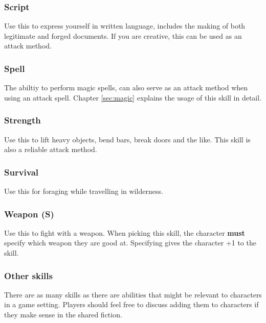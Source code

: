 \begin{multicols}{2}
\subsubsection*{Script}
Use this to express yourself in written language, includes the making of both legitimate and forged documents. If you are creative, this can be used as an attack method.
\subsubsection*{Spell}
The abiltiy to perform magic spells, can also serve as an attack method when using an attack spell. Chapter \ref{sec:magic} explains the usage of this skill in detail.
\subsubsection*{Strength}
Use this to lift heavy objects, bend bars, break doors and the like. This skill is also a reliable attack method.
\subsubsection*{Survival}
Use this for foraging while travelling in wilderness.
\subsubsection*{Weapon (S)}
Use this to fight with a weapon. When picking this skill, the character \textbf{must} specify which weapon they are good at. Specifying gives the character +1 to the skill.
\subsubsection*{Other skills}
There are as many skills as there are abilities that might be relevant to characters in a game setting. Players should feel free to discuss adding them to characters if they make sense in the shared fiction.
\end{multicols}

